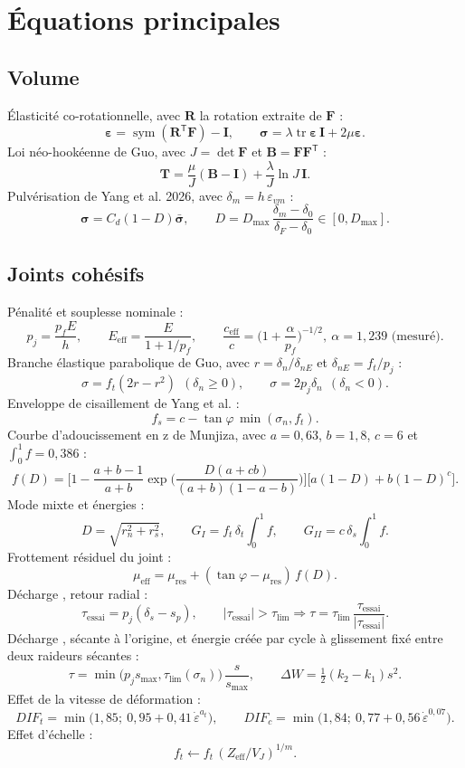 \section{Équations principales}
\label{sec-annexe-equations}

\subsection{Volume}

Élasticité co-rotationnelle, avec $\mathbf R$ la rotation extraite de $\mathbf F$ :
\[
\boldsymbol\varepsilon = \operatorname{sym}(\mathbf R^{\mathsf T}\mathbf F) - \mathbf I, \qquad
\boldsymbol\sigma = \lambda \operatorname{tr}\boldsymbol\varepsilon\, \mathbf I + 2\mu\boldsymbol\varepsilon .
\]
Loi néo-hookéenne de Guo, avec $J = \det\mathbf F$ et $\mathbf B = \mathbf F\mathbf F^{\mathsf T}$ :
\[
\mathbf T = \frac{\mu}{J}(\mathbf B - \mathbf I) + \frac{\lambda}{J}\ln J\, \mathbf I .
\]
Pulvérisation de Yang et al. 2026, avec $\delta_m = h\,\varepsilon_{vm}$ :
\[
\boldsymbol\sigma = C_d (1 - D)\bar{\boldsymbol\sigma}, \qquad
D = D_\text{max}\, \frac{\delta_m - \delta_0}{\delta_F - \delta_0} \in [0, D_\text{max}] .
\]

\subsection{Joints cohésifs}

Pénalité et souplesse nominale :
\[
p_j = \frac{p_f E}{h}, \qquad E_\text{eff} = \frac{E}{1 + 1/p_f}, \qquad
\frac{c_\text{eff}}{c} = \Big(1 + \frac{\alpha}{p_f}\Big)^{-1/2},\ \alpha = 1{,}239 \text{ (mesuré)} .
\]
Branche élastique parabolique de Guo, avec $r = \delta_n/\delta_{nE}$ et $\delta_{nE} = f_t/p_j$ :
\[
\sigma = f_t (2r - r^2) \ \ (\delta_n \geq 0), \qquad \sigma = 2 p_j \delta_n \ \ (\delta_n < 0) .
\]
Enveloppe de cisaillement de Yang et al. :
\[
f_s = c - \tan\varphi\, \min(\sigma_n, f_t) .
\]
Courbe d'adoucissement en z de Munjiza, avec $a = 0{,}63$, $b = 1{,}8$, $c = 6$ et $\int_0^1 f = 0{,}386$ :
\[
f(D) = \Big[1 - \frac{a+b-1}{a+b} \exp\Big(\frac{D(a+cb)}{(a+b)(1-a-b)}\Big)\Big]\big[a(1-D) + b(1-D)^c\big] .
\]
Mode mixte et énergies :
\[
D = \sqrt{r_n^2 + r_s^2}, \qquad G_I = f_t\, \delta_t \int_0^1 f, \qquad G_{II} = c\, \delta_s \int_0^1 f .
\]
Frottement résiduel du joint :
\[
\mu_\text{eff} = \mu_\text{res} + (\tan\varphi - \mu_\text{res})\, f(D) .
\]
Décharge , retour radial :
\[
\tau_\text{essai} = p_j(\delta_s - s_p), \qquad |\tau_\text{essai}| > \tau_\text{lim} \Rightarrow \tau = \tau_\text{lim}\, \frac{\tau_\text{essai}}{|\tau_\text{essai}|} .
\]
Décharge , sécante à l'origine, et énergie créée par cycle à glissement fixé entre deux raideurs sécantes :
\[
\tau = \min\big(p_j s_\text{max}, \tau_\text{lim}(\sigma_n)\big)\, \frac{s}{s_\text{max}}, \qquad \Delta W = \tfrac12 (k_2 - k_1) s^2 .
\]
Effet de la vitesse de déformation :
\[
DIF_t = \min\big(1{,}85;\ 0{,}95 + 0{,}41\,\dot\varepsilon^{a_t}\big), \qquad
DIF_c = \min\big(1{,}84;\ 0{,}77 + 0{,}56\,\dot\varepsilon^{0{,}07}\big) .
\]
Effet d'échelle :
\[
f_t \leftarrow f_t\, (Z_\text{eff}/V_J)^{1/m} .
\]

